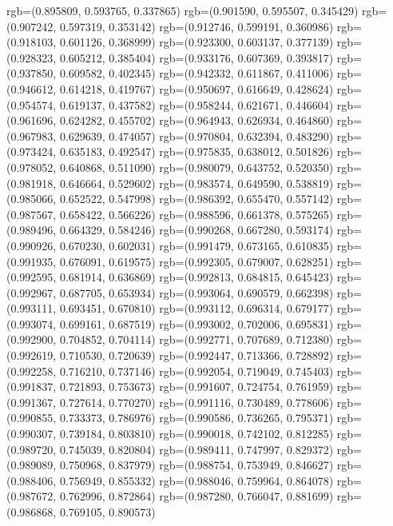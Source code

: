 {{{					rgb=(0.895809, 0.593765, 0.337865)
					rgb=(0.901590, 0.595507, 0.345429)
					rgb=(0.907242, 0.597319, 0.353142)
					rgb=(0.912746, 0.599191, 0.360986)
					rgb=(0.918103, 0.601126, 0.368999)
					rgb=(0.923300, 0.603137, 0.377139)
					rgb=(0.928323, 0.605212, 0.385404)
					rgb=(0.933176, 0.607369, 0.393817)
					rgb=(0.937850, 0.609582, 0.402345)
					rgb=(0.942332, 0.611867, 0.411006)
					rgb=(0.946612, 0.614218, 0.419767)
					rgb=(0.950697, 0.616649, 0.428624)
					rgb=(0.954574, 0.619137, 0.437582)
					rgb=(0.958244, 0.621671, 0.446604)
					rgb=(0.961696, 0.624282, 0.455702)
					rgb=(0.964943, 0.626934, 0.464860)
					rgb=(0.967983, 0.629639, 0.474057)
					rgb=(0.970804, 0.632394, 0.483290)
					rgb=(0.973424, 0.635183, 0.492547)
					rgb=(0.975835, 0.638012, 0.501826)
					rgb=(0.978052, 0.640868, 0.511090)
					rgb=(0.980079, 0.643752, 0.520350)
					rgb=(0.981918, 0.646664, 0.529602)
					rgb=(0.983574, 0.649590, 0.538819)
					rgb=(0.985066, 0.652522, 0.547998)
					rgb=(0.986392, 0.655470, 0.557142)
					rgb=(0.987567, 0.658422, 0.566226)
					rgb=(0.988596, 0.661378, 0.575265)
					rgb=(0.989496, 0.664329, 0.584246)
					rgb=(0.990268, 0.667280, 0.593174)
					rgb=(0.990926, 0.670230, 0.602031)
					rgb=(0.991479, 0.673165, 0.610835)
					rgb=(0.991935, 0.676091, 0.619575)
					rgb=(0.992305, 0.679007, 0.628251)
					rgb=(0.992595, 0.681914, 0.636869)
					rgb=(0.992813, 0.684815, 0.645423)
					rgb=(0.992967, 0.687705, 0.653934)
					rgb=(0.993064, 0.690579, 0.662398)
					rgb=(0.993111, 0.693451, 0.670810)
					rgb=(0.993112, 0.696314, 0.679177)
					rgb=(0.993074, 0.699161, 0.687519)
					rgb=(0.993002, 0.702006, 0.695831)
					rgb=(0.992900, 0.704852, 0.704114)
					rgb=(0.992771, 0.707689, 0.712380)
					rgb=(0.992619, 0.710530, 0.720639)
					rgb=(0.992447, 0.713366, 0.728892)
					rgb=(0.992258, 0.716210, 0.737146)
					rgb=(0.992054, 0.719049, 0.745403)
					rgb=(0.991837, 0.721893, 0.753673)
					rgb=(0.991607, 0.724754, 0.761959)
					rgb=(0.991367, 0.727614, 0.770270)
					rgb=(0.991116, 0.730489, 0.778606)
					rgb=(0.990855, 0.733373, 0.786976)
					rgb=(0.990586, 0.736265, 0.795371)
					rgb=(0.990307, 0.739184, 0.803810)
					rgb=(0.990018, 0.742102, 0.812285)
					rgb=(0.989720, 0.745039, 0.820804)
					rgb=(0.989411, 0.747997, 0.829372)
					rgb=(0.989089, 0.750968, 0.837979)
					rgb=(0.988754, 0.753949, 0.846627)
					rgb=(0.988406, 0.756949, 0.855332)
					rgb=(0.988046, 0.759964, 0.864078)
					rgb=(0.987672, 0.762996, 0.872864)
					rgb=(0.987280, 0.766047, 0.881699)
					rgb=(0.986868, 0.769105, 0.890573)
}}}
